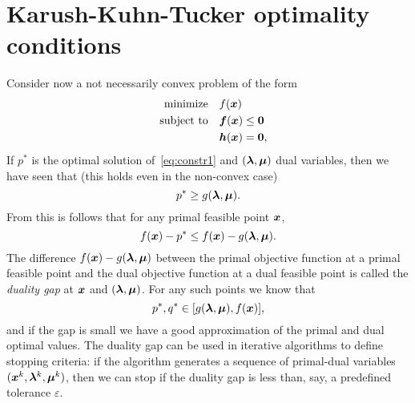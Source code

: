 \section{Karush-Kuhn-Tucker optimality conditions}
Consider now a not necessarily convex problem of the form
\begin{align}\label{eq:constr1}
\begin{split}
 \text{minimize}\quad & f(\bm{x})\\
 \quad\text{subject to}\quad & \bm{f}(\bm{x})\leq \bm{0}\\
         & \bm{h}(\bm{x}) = \bm{0},
\end{split}
\end{align}
If $p^*$ is the optimal solution of~\eqref{eq:constr1} and $(\bm{\lambda},\bm{\mu})$ dual variables, then we have seen that (this holds even in the non-convex case)
\begin{equation*}
 p^*\geq g(\bm{\lambda},\bm{\mu}).
\end{equation*}
From this is follows that for any primal feasible point $\bm{x}$,
\begin{equation*}
 f(\bm{x})-p^*\leq f(\bm{x})-g(\bm{\lambda},\bm{\mu}).
\end{equation*}
The difference $f(\bm{x})-g(\bm{\lambda},\bm{\mu})$ between the primal objective function at a primal feasible point and the dual objective function at a dual feasible point is called the {\em duality gap} at $\bm{x}$ and $(\bm{\lambda},\bm{\mu})$. For any such points we know that
\begin{equation*}
 p^*, q^* \in [g(\bm{\lambda},\bm{\mu}),f(\bm{x})],
\end{equation*}
and if the gap is small we have a good approximation of the primal and dual optimal values. The duality gap can be used in iterative algorithms to define stopping criteria: if the algorithm generates a sequence of primal-dual variables $(\bm{x}^k,\bm{\lambda}^k,\bm{\mu}^k)$, then we can stop if the duality gap is less than, say, a predefined tolerance $\varepsilon$.

